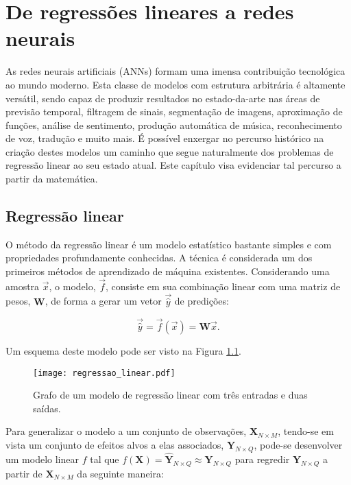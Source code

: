 \chapter{De regressões lineares a redes neurais}

  As redes neurais artificiais (ANNs) formam uma imensa contribuição tecnológica ao mundo moderno. Esta classe de modelos com estrutura arbitrária é altamente versátil, sendo capaz de produzir resultados no estado-da-arte nas áreas de previsão temporal, filtragem de sinais, segmentação de imagens, aproximação de funções, análise de sentimento, produção automática de música, reconhecimento de voz, tradução e muito mais. É possível enxergar no percurso histórico na criação destes modelos um caminho que segue naturalmente dos problemas de regressão linear ao seu estado atual. Este capítulo visa evidenciar tal percurso a partir da matemática.

  \section{Regressão linear} \label{s:reg_linear}

    O método da regressão linear é um modelo estatístico bastante simples e com propriedades profundamente conhecidas. A técnica é considerada um dos primeiros métodos de aprendizado de máquina existentes. Considerando uma amostra $\vec{x}$, o modelo, $\vec{f}$, consiste em sua combinação linear com uma matriz de pesos, $\boldsymbol{W}$, de forma a gerar um vetor $\vec{\hat{y}}$ de predições:

    \begin{equation} \label{e:reg_linear_amostra}
      \vec{\hat{y}} = \vec{f}(\vec{x}) = \boldsymbol{W} \vec{x}
      .
    \end{equation}

    \noindent Um esquema deste modelo pode ser visto na Figura \ref{f:regressao_linear}.

    \begin{figure}
      \begin{center}
        \texttt{[image: regressao\_linear.pdf]}
      \end{center}
      \caption{Grafo de um modelo de regressão linear com três entradas e duas saídas.}
      \label{f:regressao_linear}
    \end{figure}

    Para generalizar o modelo a um conjunto de observações, $\boldsymbol{X}_{N\times M}$, tendo-se em vista um conjunto de efeitos alvos a elas associados, $\boldsymbol{Y}_{N\times Q}$, pode-se desenvolver um modelo linear $f$ tal que $f(\boldsymbol{X}) = \boldsymbol{\hat{Y}}_{N\times Q} \approx \boldsymbol{Y}_{N\times Q}$ para regredir $\boldsymbol{Y}_{N\times Q}$ a partir de $\boldsymbol{X}_{N\times M}$ da seguinte maneira:

